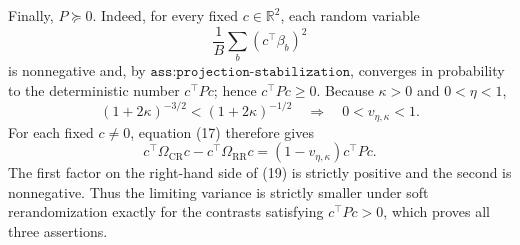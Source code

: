 Finally, \(P\succeq0\). Indeed, for every fixed \(c\in\mathbb R^2\), each random variable
\[
\frac1B\sum_b(c^\top\beta_b)^2
\]
is nonnegative and, by \(\texttt{ass:projection-stabilization}\), converges in probability to the deterministic number \(c^\top Pc\); hence \(c^\top Pc\geq0\). Because \(\kappa>0\) and \(0<\eta<1\),
\[
(1+2\kappa)^{-3/2}<(1+2\kappa)^{-1/2}
\quad\Longrightarrow\quad
0<v_{\eta,\kappa}<1.                                                       \tag{18}
\]
For each fixed \(c\neq0\), equation (17) therefore gives
\[
c^\top\Omega_{\mathrm{CR}}c-c^\top\Omega_{\mathrm{RR}}c
=(1-v_{\eta,\kappa})c^\top Pc.                                           \tag{19}
\]
The first factor on the right-hand side of (19) is strictly positive and the second is nonnegative. Thus the limiting variance is strictly smaller under soft rerandomization exactly for the contrasts satisfying \(c^\top Pc>0\), which proves all three assertions.